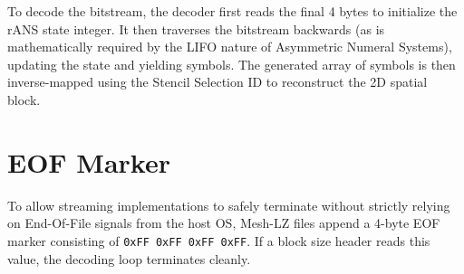 To decode the bitstream, the decoder first reads the final 4 bytes to initialize the rANS state integer. It then traverses the bitstream backwards (as is mathematically required by the LIFO nature of Asymmetric Numeral Systems), updating the state and yielding symbols. The generated array of symbols is then inverse-mapped using the Stencil Selection ID to reconstruct the 2D spatial block.

\section{EOF Marker}
To allow streaming implementations to safely terminate without strictly relying on End-Of-File signals from the host OS, Mesh-LZ files append a 4-byte EOF marker consisting of \texttt{0xFF 0xFF 0xFF 0xFF}. If a block size header reads this value, the decoding loop terminates cleanly.
